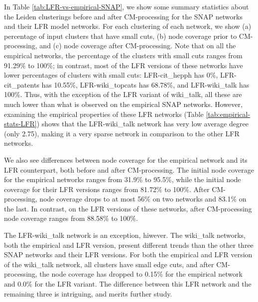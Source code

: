 \documentclass[11pt]{article}   	%
\begin{document}
In Table \ref{tab:LFR-vs-empirical-SNAP}, we show some summary statistics about the  Leiden clusterings before and after CM-processing for the SNAP networks and their LFR model networks.  For each clustering of each network, we  show (a) percentage of input clusters that have small cuts, (b) node coverage prior to CM-processing, and (c) node coverage after CM-processing.  
Note that on all the empirical networks, the percentage of the clusters with small cuts ranges from 91.29\% to 100\%; in contrast, most of the LFR versions of these
networks have lower percentages of clusters with small cuts: 
LFR-cit\_hepph has 0\%, 
LFR-cit\_patents has 10.55\%, 
LFR-wiki\_topcats has 68.78\%, and 
LFR-wiki\_talk has 100\%.  
Thus, with the exception of the LFR variant of wiki\_talk, all these are much lower than what is observed on the empirical SNAP networks.
However, examining the empirical properties of these LFR networks (Table \ref{tab:empirical-stats-LFR}) shows that the LFR-wiki\_talk network has very 
low average degree (only 2.75), making it a very sparse network in comparison to the other LFR networks.

We also see differences between node coverage for the empirical network and its  LFR counterpart, both before and after CM-processing. 
The initial node coverage for the empirical networks ranges from 31.9\% to 95.5\%, while the initial node coverage for their LFR versions ranges from 81.72\% to 100\%. 
After CM-processing,   node coverage drops to at most 56\% on two networks and 83.1\% on the last. In contrast, on the LFR versions of these networks, after CM-processing 
node coverage  ranges from 88.58\% to 100\%. 

The LFR-wiki\_talk network is an exception, hiwever. The wiki\_talk networks, both the empirical and LFR version, present different trends than the other three SNAP networks and their LFR versions. 
For both the empirical and LFR version of the wiki\_talk network, all clusters have small edge cuts, and after CM-processing, the node coverage has dropped to 0.15\% for the
empirical network and 0.0\% for the LFR variant. 
The difference between this LFR network and the remaining three is intriguing, and merits further study.
\end{document}
